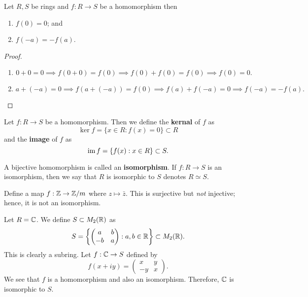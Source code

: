 
\begin{lemma}[]
    Let $R, S$ be rings and $f: R \to S$ be a homomorphism then
    \begin{enumerate}
        \item $f(0) = 0$; and
        \item $f(-a) = -f(a)$.
    \end{enumerate}
\end{lemma}

\begin{proof}
    \begin{enumerate}
        \item \[ 0 + 0 = 0 \implies f(0 + 0) = f(0) \implies f(0) + f(0) = f(0) \implies f(0) = 0. \]
        \item \[ a + (-a) = 0 \implies f(a + (-a)) = f(0) \implies f(a) + f(-a) = 0 \implies f(-a) = -f(a). \]
    \end{enumerate}
\end{proof}

\begin{definition}
    Let $f: R \to S$ be a homomorphism. Then we define the \textbf{kernal} of $f$ as
    \[ \ker{f} = \{ x \in R : f(x) = 0 \} \subset R \]
    and the \textbf{image} of $f$ as
    \[ \operatorname{im}{f} = \{ f(x): x \in R \} \subset S. \]
\end{definition}

\begin{definition}[Isomorphism]
    A bijective homomorphism is called an \textbf{isomorphism}. If $f: R \to S$ is an isomorphism, then we say that $R$ is isomorphic to $S$ denotes $R \simeq S$.
\end{definition}

\begin{example}
    Define a map $f: \mathbb{Z} \to \mathbb{Z}/m$ where $z \mapsto \bar z$. This is surjective but \emph{not} injective; hence, it is not an isomorphism.
\end{example}

\begin{example}
    Let $R = \mathbb{C}$. We define $S \subset M_2(\mathbb{R})$ as
    \[ S = \left\{ \begin{pmatrix} a & b \\ -b & a \end{pmatrix}: a, b \in \mathbb{R} \right\} \subset M_2(\mathbb{R}). \]
    This is clearly a subring. Let $f: \mathbb{C} \to S$ defined by
    \[ f(x + iy) = \begin{pmatrix} x & y \\ -y & x \end{pmatrix}. \]
    We see that $f$ is a homomorphism and also an isomorphism. Therefore, $\mathbb{C}$ is isomorphic to $S$.
\end{example}

